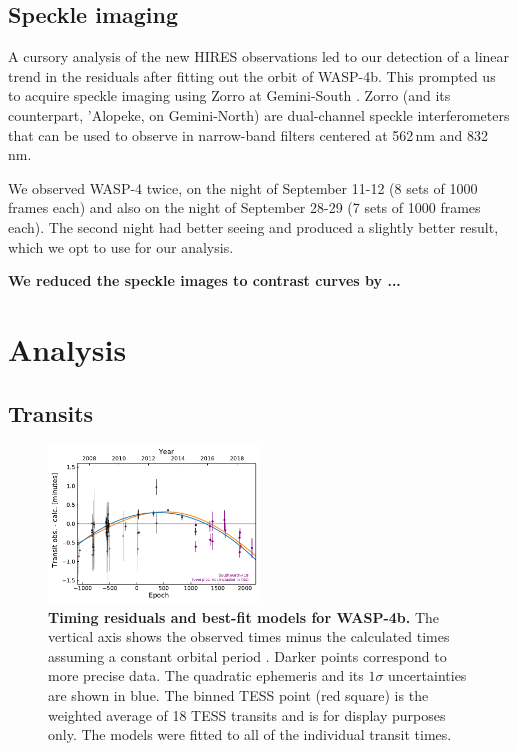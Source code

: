 \documentclass[12pt,twocolumn,tighten]{aastex62}
\begin{document}
\subsection{Speckle imaging}

A cursory analysis of the new HIRES observations led to our detection
of a linear trend in the residuals after fitting out the orbit of
WASP-4b.  This prompted us to acquire speckle imaging using Zorro at
Gemini-South \citep[see][, and the instrument
web-pages\footnote{\url{www.gemini.edu/sciops/instruments/alopeke-zorro/}}]{scott_nessi_2018}.
Zorro (and its counterpart, 'Alopeke, on Gemini-North) are
dual-channel speckle interferometers that can be used to observe in
narrow-band filters centered at 562$\,$nm and 832$\,$nm.  

We observed WASP-4 twice, on the night of September 11-12 (8 sets of
1000 frames each) and also on the night of September 28-29 (7 sets of
1000 frames each). The second night had better seeing and produced a
slightly better result, which we opt to use for our analysis.

{\bf We reduced the speckle images to contrast curves by ...}


\section{Analysis}
\label{sec:analysis}

\subsection{Transits}

\begin{figure}[t]
	\begin{center}
		\leavevmode
		\includegraphics[width=0.5\textwidth]{f1.pdf}
	\end{center}
	\vspace{-0.7cm}
  \caption{ {\bf Timing residuals and best-fit models for WASP-4b.}
  The vertical axis shows the observed times minus the calculated
  times assuming a constant orbital period .  Darker points correspond
  to more precise data.  The quadratic ephemeris and its $1\sigma$
  uncertainties are shown in blue.  The binned TESS point (red square)
  is the weighted average of 18 TESS transits and is for display
  purposes only.  The models were fitted to all of the individual
  transit times.
  \label{fig:times}
	}
\end{figure}
\end{document}
